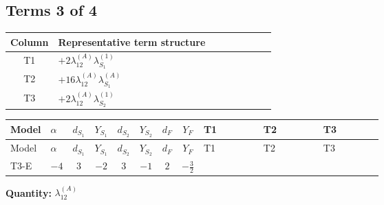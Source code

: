 \documentclass[8pt]{article}
\begin{document}
\begin{landscape}
\subsection*{Terms 3 of 4}
\begin{center}
\begin{tabular}{@{}c >{\raggedright\arraybackslash}p{0.82\linewidth}@{}}
\toprule
Column & Representative term structure \\
\midrule
T1 & \(\displaystyle +2 {\lambda_{12}^{(A)}} {\lambda_{S_1}^{(1)}}\) \\
\midrule
T2 & \(\displaystyle +16 {\lambda_{12}^{(A)}} {\lambda_{S_1}^{(A)}}\) \\
\midrule
T3 & \(\displaystyle +2 {\lambda_{12}^{(A)}} {\lambda_{S_2}^{(1)}}\) \\
\midrule
\bottomrule
\end{tabular}
\end{center}
\smallskip
\tiny
\begin{longtable}{@{}llcccccc >{\raggedright\arraybackslash}p{0.21\linewidth} >{\raggedright\arraybackslash}p{0.21\linewidth} >{\raggedright\arraybackslash}p{0.21\linewidth}@{}}
\toprule
Model & $\alpha$ & $d_{S_1}$ & $Y_{S_1}$ & $d_{S_2}$ & $Y_{S_2}$ & $d_F$ & $Y_F$ & T1 & T2 & T3 \\
\midrule
\endfirsthead
\toprule
Model & $\alpha$ & $d_{S_1}$ & $Y_{S_1}$ & $d_{S_2}$ & $Y_{S_2}$ & $d_F$ & $Y_F$ & T1 & T2 & T3 \\
\midrule
\endhead
T3-E & $-4$ & $3$ & $-2$ & $3$ & $-1$ & $2$ & $-\frac{3}{2}$ & \scriptsize\adjustbox{max width=\linewidth}{$\begin{gathered} +2 {\lambda_{12}^{(A)}} {\lambda_{S_1}^{(1)}}\end{gathered}$} & \scriptsize\adjustbox{max width=\linewidth}{$\begin{gathered} +16 {\lambda_{12}^{(A)}} {\lambda_{S_1}^{(A)}}\end{gathered}$} & \scriptsize\adjustbox{max width=\linewidth}{$\begin{gathered} +2 {\lambda_{12}^{(A)}} {\lambda_{S_2}^{(1)}}\end{gathered}$} \\
\midrule
\bottomrule
\end{longtable}
\clearpage
\noindent\textbf{Quantity: }$\lambda_{12}^{(A)}$\par\smallskip

\end{landscape}
\end{document}
